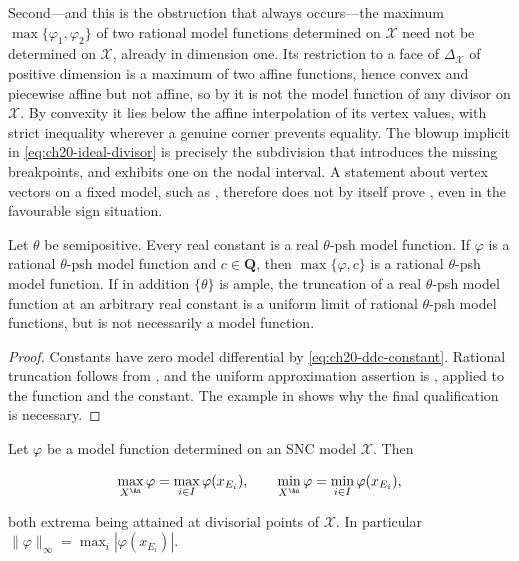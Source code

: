 \begin{example}
Second---and this is the obstruction that always occurs---the maximum
\(\max\{\varphi_1,\varphi_2\}\) of two rational model functions determined
on \(\mathcal X\) need not be determined on \(\mathcal X\), already in
dimension one.  Its restriction to a face of
\(\Delta_{\mathcal X}\) of positive dimension is a maximum of two affine
functions, hence convex and piecewise affine but not affine, so by
 it is not the model function of any
divisor on \(\mathcal X\).  By convexity it lies below the affine
interpolation of its vertex values, with strict inequality wherever a
genuine corner prevents equality.  The blowup implicit in
\eqref{eq:ch20-ideal-divisor} is precisely the subdivision that introduces
the missing breakpoints, and  exhibits one on the
nodal interval.  A statement about vertex vectors on a fixed model, such as
, therefore does not by itself prove
, even in the favourable sign situation.
\end{example}

\begin{corollary}
\label{cor:ch20-truncation}
Let \(\theta\) be semipositive.  Every real constant is a real
\(\theta\)-psh model function.  If \(\varphi\) is a rational
\(\theta\)-psh model function and \(c\in\mathbf Q\), then
\(\max\{\varphi,c\}\) is a rational \(\theta\)-psh model function.
If in addition \(\{\theta\}\) is ample, the truncation of a real
\(\theta\)-psh model function at an arbitrary real constant is a uniform
limit of rational \(\theta\)-psh model functions, but is not necessarily
a model function.
\end{corollary}

\begin{proof}
Constants have zero model differential by
\eqref{eq:ch20-ddc-constant}.  Rational truncation follows from
, and the uniform approximation assertion is
, applied to the function
and the constant.  The example in
 shows why the final
qualification is necessary.
\end{proof}

\begin{proposition}
\label{prop:ch20-maximum-principle}
Let \(\varphi\) be a model function determined on an SNC model
\(\mathcal X\).  Then

\begin{equation}
\label{eq:ch20-maximum-principle}
 \max_{X^{\An}}\varphi=\max_{i\in I}\varphi(x_{E_i}),
 \qquad
 \min_{X^{\An}}\varphi=\min_{i\in I}\varphi(x_{E_i}),
\end{equation}

both extrema being attained at divisorial points of \(\mathcal X\).  In
particular \(\|\varphi\|_\infty=\max_i|\varphi(x_{E_i})|\).
\end{proposition}

